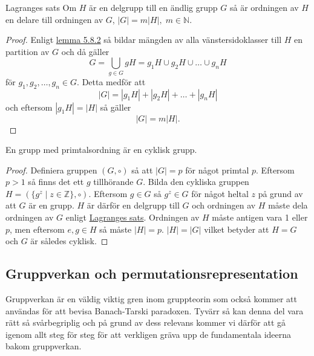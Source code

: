 \documentclass{article}
\theoremstyle{definition}
\begin{document}
\hypertarget{lag}{}
\begin{mytheo}{Lagranges sats}{}
  Om $H$ är en delgrupp till en ändlig grupp $G$ så är ordningen av $H$ en delare till ordningen av 
  $G$, 
  $|G| = m |H|, \; m \in \mathbb{N}$.
\end{mytheo}
\begin{proof}
  Enligt \hyperlink{lemma4.2}{lemma 5.8.2} så bildar mängden av alla vänstersidoklasser
  till $H$ en 
  partition av $G$ och då gäller
  \[G = \bigcup_{g \in G} gH = g_1H \cup g_2H \cup \ldots \cup g_nH\]
  för $g_1, g_2, \ldots, g_n \in G.$
  Detta medför att 
  \[|G| = |g_1H| + |g_2H| + \ldots + |g_nH|\]
  och eftersom $|g_1H| = |H|$ så gäller 
  \[|G| = m |H|.\]
\end{proof}
\begin{mykol}{}{}
  En grupp med primtalsordning är en cyklisk grupp.
\end{mykol}
\begin{proof}
  Definiera gruppen $(G, \circ)$ så att $|G| = p$ för något primtal $p$. Eftersom 
  $p > 1$ så finns det ett $g$ tillhörande $G$. Bilda den cykliska gruppen 
  $H = (\{g^z \; | \; z \in \mathbb{Z}\}, \circ)$. Eftersom $g \in G$ så $g^z \in G$ 
  för något heltal $z$ på grund av att $G$ är en grupp. $H$ är därför en delgrupp till $G$ och 
  ordningen av $H$ måste dela ordningen av $G$ enligt \hyperlink{lag}{Lagranges sats}.
  Ordningen av $H$ måste antigen vara 1 eller $p$, men eftersom $e, g \in H$ så måste 
  $|H| = p$. $|H| = |G|$ vilket betyder att $H = G$ och $G$ är således cyklisk.
\end{proof}

\subsection{Gruppverkan och permutationsrepresentation}
Gruppverkan är en väldig viktig gren inom gruppteorin som också kommer att användas 
för att bevisa Banach-Tarski paradoxen. 
Tyvärr så kan denna del vara rätt så svårbegriplig och på grund av dess relevans 
kommer vi därför att gå igenom allt steg för steg för att verkligen gräva upp
de fundamentala ideerna bakom gruppverkan. 


\end{document}
